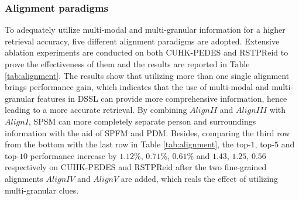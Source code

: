 \documentclass[sigconf]{acmart}
\begin{document}
\subsubsection{Alignment paradigms}
To adequately utilize multi-modal and multi-granular information for a higher retrieval accuracy, five different alignment paradigms are adopted. Extensive ablation experiments are conducted on both CUHK-PEDES and RSTPReid to prove the effectiveness of them and the results are reported in Table \ref{tab:alignment}. The results show that utilizing more than one single alignment brings performance gain, which indicates that the use of multi-modal and multi-granular features in DSSL can provide more comprehensive information, hence leading to a more accurate retrieval. By combining $Align II$ and $Align III$ with $Align I$, SPSM can more completely separate person and surroundings information with the aid of SPFM and PDM. Besides, comparing the third row from the bottom with the last row in Table \ref{tab:alignment}, the top-$1$, top-$5$ and top-$10$ performance increase by $1.12\%$, $0.71\%$, $0.61\%$ and $1.43$, $1.25$, $0.56$ respectively on CUHK-PEDES and RSTPReid after the two fine-grained alignments $Align IV$ and $Align V$ are added, which reals the effect of utilizing multi-granular clues.
\end{document}
